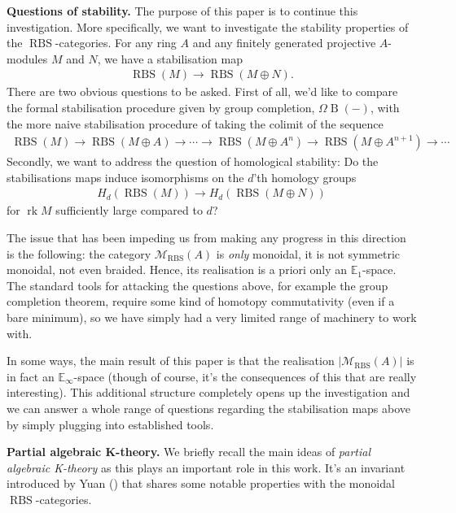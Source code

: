 \documentclass[12pt, reqno]{amsart}
\theoremstyle{plain}
\theoremstyle{definition}
\begin{document}
\textbf{Questions of stability.} The purpose of this paper is to continue this investigation. More specifically, we want to investigate the stability properties of the $\operatorname{RBS}$-categories. For any ring $A$ and any finitely generated projective $A$-modules $M$ and $N$, we have a stabilisation map
\begin{align*}
\operatorname{RBS}(M)\rightarrow \operatorname{RBS}(M\oplus N).
\end{align*}
There are two obvious questions to be asked. First of all, we'd like to compare the formal stabilisation procedure given by group completion, $\Omega \operatorname{B}(-)$, with the more naive stabilisation procedure of taking the colimit of the sequence
\begin{align*}
\operatorname{RBS}(M)\rightarrow \operatorname{RBS}(M\oplus A)\rightarrow \cdots \rightarrow  \operatorname{RBS}(M\oplus A^n) \rightarrow \operatorname{RBS}(M\oplus A^{n+1})\rightarrow \cdots
\end{align*}
Secondly, we want to address the question of homological stability: Do the stabilisations maps induce isomorphisms on the $d$'th homology groups
\begin{align*}
H_d(\operatorname{RBS}(M))\rightarrow H_d(\operatorname{RBS}(M\oplus N))
\end{align*}
for $\operatorname{rk} M$ sufficiently large compared to $d$?

The issue that has been impeding us from making any progress in this direction is the following: the category $\mathscr{M}_{\operatorname{RBS}}(A)$ is \textit{only} monoidal, it is not symmetric monoidal, not even braided. Hence, its realisation is a priori only an $\mathbb{E}_1$-space. The standard tools for attacking the questions above, for example the group completion theorem, require some kind of homotopy commutativity (even if a bare minimum), so we have simply had a very limited range of machinery to work with.

In some ways, the main result of this paper is that the realisation $|\mathscr{M}_{\operatorname{RBS}}(A)|$ is in fact an $\mathbb{E}_\infty$-space (though of course, it's the consequences of this that are really interesting). This additional structure completely opens up the investigation and we can answer a whole range of questions regarding the stabilisation maps above by simply plugging into established tools.

\medskip

\textbf{Partial algebraic K-theory.} We briefly recall the main ideas of \textit{partial algebraic K-theory} as this plays an important role in this work. It's an invariant introduced by Yuan (\cite{Yuan}) that shares some notable properties with the monoidal $\operatorname{RBS}$-categories.
\end{document}
